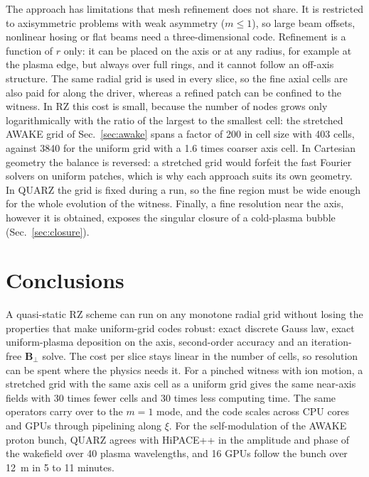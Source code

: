 \documentclass[aps,prab,reprint,floatfix,superscriptaddress,amsmath,amssymb]{revtex4-2}
\begin{document}
The approach has limitations that mesh refinement does not share. It is restricted to axisymmetric problems with weak asymmetry ($m\le 1$), so large beam offsets, nonlinear hosing or flat beams need a three-dimensional code. Refinement is a function of $r$ only: it can be placed on the axis or at any radius, for example at the plasma edge, but always over full rings, and it cannot follow an off-axis structure. The same radial grid is used in every slice, so the fine axial cells are also paid for along the driver, whereas a refined patch can be confined to the witness. In RZ this cost is small, because the number of nodes grows only logarithmically with the ratio of the largest to the smallest cell: the stretched AWAKE grid of Sec.~\ref{sec:awake} spans a factor of 200 in cell size with 403 cells, against 3840 for the uniform grid with a 1.6 times coarser axis cell. In Cartesian geometry the balance is reversed: a stretched grid would forfeit the fast Fourier solvers on uniform patches, which is why each approach suits its own geometry. In QUARZ the grid is fixed during a run, so the fine region must be wide enough for the whole evolution of the witness. Finally, a fine resolution near the axis, however it is obtained, exposes the singular closure of a cold-plasma bubble (Sec.~\ref{sec:closure}).

\section{Conclusions}

A quasi-static RZ scheme can run on any monotone radial grid without losing the properties that make uniform-grid codes robust: exact discrete Gauss law, exact uniform-plasma deposition on the axis, second-order accuracy and an iteration-free $\bm{B}_\perp$ solve. The cost per slice stays linear in the number of cells, so resolution can be spent where the physics needs it. For a pinched witness with ion motion, a stretched grid with the same axis cell as a uniform grid gives the same near-axis fields with 30 times fewer cells and 30 times less computing time. The same operators carry over to the $m=1$ mode, and the code scales across CPU cores and GPUs through pipelining along $\xi$. For the self-modulation of the AWAKE proton bunch, QUARZ agrees with HiPACE++ in the amplitude and phase of the wakefield over 40 plasma wavelengths, and 16 GPUs follow the bunch over 12~m in 5 to 11 minutes.
\end{document}
